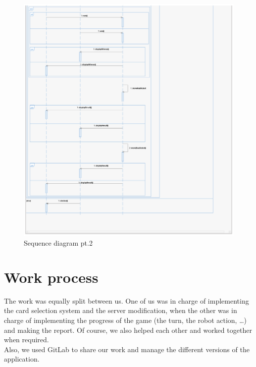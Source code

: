 \documentclass[a4paper, 10pt, oneside]{article}
\begin{document}
	\begin{figure}[h]
		\centering
		\includegraphics[scale=0.35]{img/sequence2.png}
		\caption{Sequence diagram pt.2}
		\label{fig:Sequence2}
	\end{figure}

\newpage
\section{Work process}
	The work was equally split between us. One of us was in charge of implementing the card selection system and the server modification, when the other was in charge of implementing the progress of the game (the turn, the robot action, \ldots) and making the report. Of course, we also helped each other and worked together when required.\\
	Also, we used GitLab to share our work and manage the different versions of the application.
\end{document}
